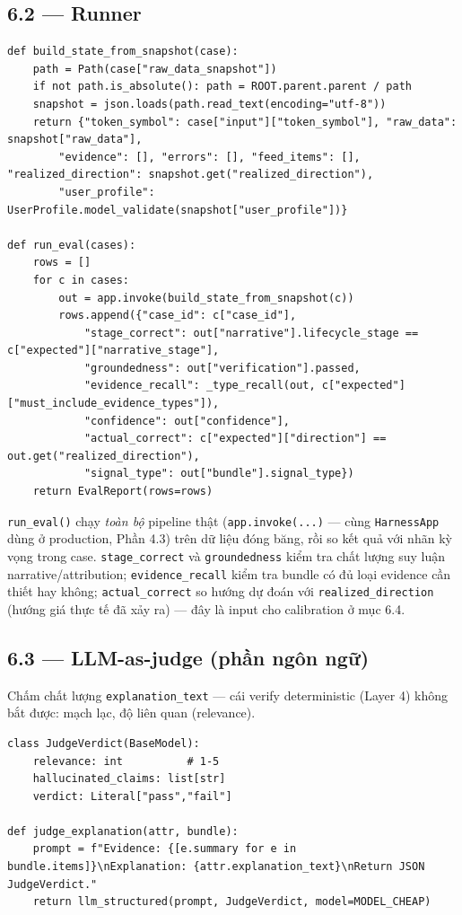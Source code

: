 \documentclass[12pt,a4paper]{article}
\begin{document}
\subsection{6.2 --- Runner}

\begin{lstlisting}
def build_state_from_snapshot(case):
    path = Path(case["raw_data_snapshot"])
    if not path.is_absolute(): path = ROOT.parent.parent / path
    snapshot = json.loads(path.read_text(encoding="utf-8"))
    return {"token_symbol": case["input"]["token_symbol"], "raw_data": snapshot["raw_data"],
        "evidence": [], "errors": [], "feed_items": [], "realized_direction": snapshot.get("realized_direction"),
        "user_profile": UserProfile.model_validate(snapshot["user_profile"])}

def run_eval(cases):
    rows = []
    for c in cases:
        out = app.invoke(build_state_from_snapshot(c))
        rows.append({"case_id": c["case_id"],
            "stage_correct": out["narrative"].lifecycle_stage == c["expected"]["narrative_stage"],
            "groundedness": out["verification"].passed,
            "evidence_recall": _type_recall(out, c["expected"]["must_include_evidence_types"]),
            "confidence": out["confidence"],
            "actual_correct": c["expected"]["direction"] == out.get("realized_direction"),
            "signal_type": out["bundle"].signal_type})
    return EvalReport(rows=rows)
\end{lstlisting}

\texttt{run\_eval()} chạy \emph{toàn bộ} pipeline thật (\texttt{app.invoke(...)} --- cùng
\texttt{HarnessApp} dùng ở production, Phần 4.3) trên dữ liệu đóng băng, rồi so kết quả với nhãn
kỳ vọng trong case. \texttt{stage\_correct} và \texttt{groundedness} kiểm tra chất lượng suy luận
narrative/attribution; \texttt{evidence\_recall} kiểm tra bundle có đủ loại evidence cần thiết hay
không; \texttt{actual\_correct} so hướng dự đoán với \texttt{realized\_direction} (hướng giá thực
tế đã xảy ra) --- đây là input cho calibration ở mục 6.4.

\subsection{6.3 --- LLM-as-judge (phần ngôn ngữ)}

Chấm chất lượng \texttt{explanation\_text} --- cái verify deterministic (Layer 4) không bắt được:
mạch lạc, độ liên quan (relevance).

\begin{lstlisting}
class JudgeVerdict(BaseModel):
    relevance: int          # 1-5
    hallucinated_claims: list[str]
    verdict: Literal["pass","fail"]

def judge_explanation(attr, bundle):
    prompt = f"Evidence: {[e.summary for e in bundle.items]}\nExplanation: {attr.explanation_text}\nReturn JSON JudgeVerdict."
    return llm_structured(prompt, JudgeVerdict, model=MODEL_CHEAP)
\end{lstlisting}
\end{document}
